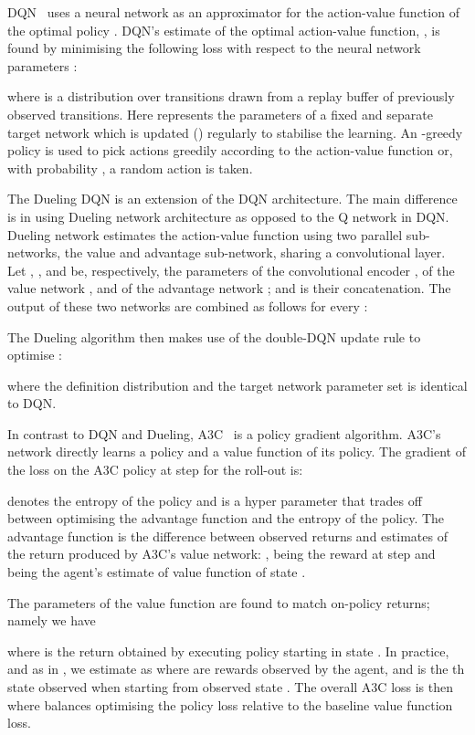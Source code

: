 \documentclass{article}
\begin{document}
DQN~\citep{mnih2015human} uses a neural network as an approximator for the action-value function of the optimal policy .
DQN's estimate of the optimal action-value function, , is found by minimising the following loss with respect to the neural network parameters :
 
where  is a distribution over transitions  drawn from a replay buffer of previously observed transitions. 
Here  represents the parameters of a fixed and separate target network which is updated () regularly to stabilise the learning.
An -greedy policy is used to pick actions greedily according to
the action-value function  or, with probability , a random action is taken.

The Dueling DQN  \citep{wang2016Dueling} is an extension of the DQN  architecture. The main difference is in using Dueling network architecture as opposed to the Q network in DQN. Dueling network estimates the action-value function using two parallel sub-networks, the value and advantage sub-network, sharing a convolutional layer. Let , , and  be, respectively, the parameters of the convolutional encoder , of the value network , and of the advantage network ; and  is their concatenation. The output of these two networks are combined  as follows for every  :



The Dueling algorithm then makes use of the double-DQN update rule \citep{van2016deep} to optimise :

 

where the definition distribution  and the target network parameter set  is identical to DQN. 

In contrast to DQN and Dueling, A3C~\citep{mnih2016asynchronous} is a policy gradient algorithm.
A3C's network directly learns a policy   and a value function  of its policy.
The gradient of the loss on the A3C policy at step  for the roll-out  is:

 denotes the entropy of the policy  and  is a hyper parameter that trades off between optimising the advantage function and the entropy of the policy.
The advantage function  is the difference between observed returns and estimates of the return produced by A3C's value network: ,  being the reward at step  and  being the agent's estimate of value function of state .

The parameters of the value function are found to match on-policy returns; namely we have 

\noindent where  is the return obtained by executing policy  starting in state .
In practice, and as in \cite{mnih2016asynchronous}, we estimate  as  where  are rewards observed by the agent, and  is the th state observed when starting from observed state .
The overall A3C loss is then  where  balances optimising the policy loss relative to the baseline value function loss.
\end{document}
